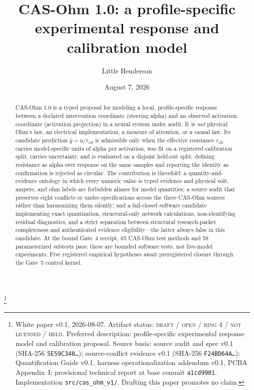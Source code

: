 \documentclass[11pt]{amsart}
\theoremstyle{definition}
\theoremstyle{remark}
\begin{document}
\title[CAS-Ohm 1.0: a profile-specific response model]{CAS-Ohm 1.0: a profile-specific experimental response and calibration model}
\author{Little Henderson}
\thanks{White paper v0.1, 2026-08-07. Artifact status: \textsc{draft / open / ring 4 / not licensed / held}. Preferred description: profile-specific experimental response model and calibration proposal. Source basis: source audit and spec v0.1 (SHA-256 \texttt{5E59C340\ldots}); source-conflict evidence v0.1 (SHA-256 \texttt{F24BD64A\ldots}); Quantification Guide v0.1, harness operationalization addendum v0.1, PCBA Appendix~I; provisional technical report at base commit \texttt{a1cd9901}. Implementation \texttt{src/cas\_ohm\_v1/}. Drafting this paper promotes no claim.}
\date{August 7, 2026}

\begin{abstract}
CAS-Ohm 1.0 is a typed proposal for modeling a local, profile-specific response between a declared intervention coordinate (steering alpha) and an observed activation coordinate (activation projection) in a neural system under audit. It is \emph{not} physical Ohm's law, an electrical implementation, a measure of attention, or a causal law. Its candidate prediction $\hat{y} = a / r_{\mathrm{eff}}$ is admissible only when the effective resistance $r_{\mathrm{eff}}$ carries model-specific units of alpha per activation, was fit on a registered calibration split, carries uncertainty, and is evaluated on a disjoint held-out split; defining resistance as alpha over response on the same samples and reporting the identity as confirmation is rejected as circular. The contribution is threefold: a quantity-and-evidence ontology in which every numeric value is typed evidence and physical volt, ampere, and ohm labels are forbidden aliases for model quantities; a source audit that preserves eight conflicts or under-specifications across the three CAS-Ohm sources rather than harmonizing them silently; and a fail-closed software candidate implementing exact quantization, structural-only network calculations, non-identifying residual diagnostics, and a strict separation between structural research-packet completeness and authenticated evidence eligibility---the latter always false in this candidate. At the bound Gate~4 receipt, 65 CAS-Ohm test methods and 58 parameterized subtests pass; these are bounded software tests, not live-model experiments. Five registered empirical hypotheses await preregistered closure through the Gate~5 control kernel.
\end{abstract}
\end{document}
